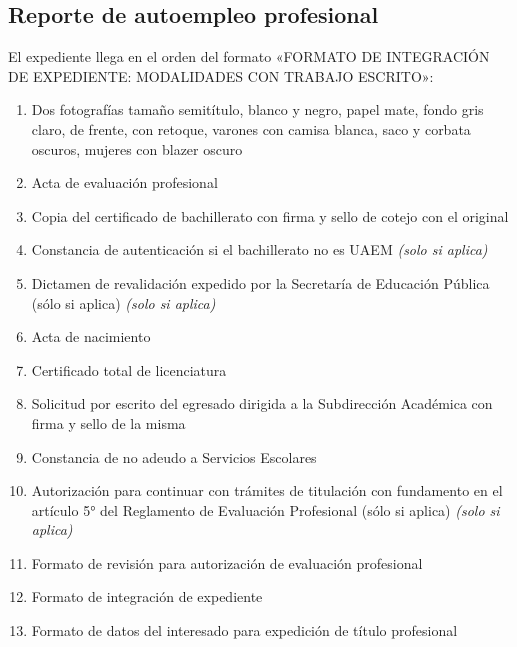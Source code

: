 \subsection{Reporte de autoempleo profesional}
El expediente llega en el orden del formato «FORMATO DE INTEGRACIÓN DE EXPEDIENTE: MODALIDADES CON TRABAJO ESCRITO»:
\begin{enumerate}
  \item Dos fotografías tamaño semitítulo, blanco y negro, papel mate, fondo gris claro, de frente, con retoque, varones con camisa blanca, saco y corbata oscuros, mujeres con blazer oscuro
  \item Acta de evaluación profesional
  \item Copia del certificado de bachillerato con firma y sello de cotejo con el original
  \item Constancia de autenticación si el bachillerato no es UAEM \emph{(solo si aplica)}
  \item Dictamen de revalidación expedido por la Secretaría de Educación Pública (sólo si aplica) \emph{(solo si aplica)}
  \item Acta de nacimiento
  \item Certificado total de licenciatura
  \item Solicitud por escrito del egresado dirigida a la Subdirección Académica con firma y sello de la misma
  \item Constancia de no adeudo a Servicios Escolares
  \item Autorización para continuar con trámites de titulación con fundamento en el artículo 5° del Reglamento de Evaluación Profesional (sólo si aplica) \emph{(solo si aplica)}
  \item Formato de revisión para autorización de evaluación profesional
  \item Formato de integración de expediente
  \item Formato de datos del interesado para expedición de título profesional
\end{enumerate}
